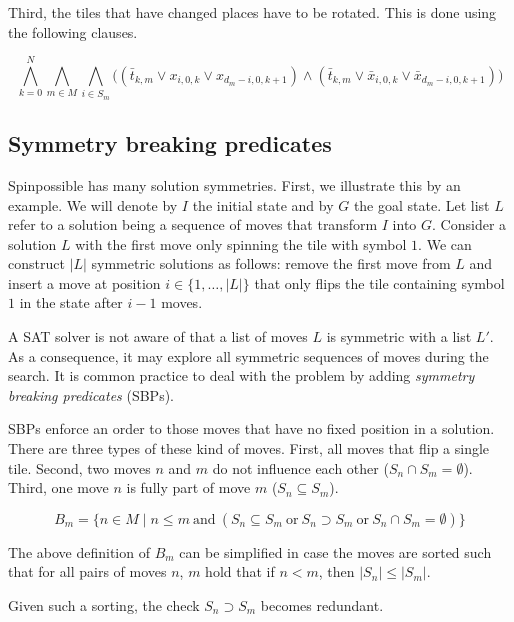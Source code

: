 \documentclass[]{llncs}
\begin{document}
Third, the tiles that have changed places have to be rotated. This is done using the following clauses.

\begin{equation}
\bigwedge_{k=0}^{N} \bigwedge_{m \in M} \bigwedge_{i \in S_m} \big( (\bar t_{k,m} \lor x_{i,0,k} \lor x_{d_m - i,0,k +
1} ) \land (\bar t_{k,m} \lor \bar x_{i,0,k} \lor \bar x_{d_m - i,0,k + 1} ) \big)
\end{equation}


\subsection{Symmetry breaking predicates}

Spinpossible has many solution symmetries. First, we illustrate this by an example. We will denote by $I$ the initial
state and by $G$ the goal state. Let list $L$ refer to a solution being a sequence of moves that transform $I$ into $G$.
Consider a solution $L$ with the first move only spinning the tile with symbol $1$. We can construct $|L|$ symmetric
solutions as follows: remove the first move from $L$ and insert a move at position $i \in \{1,\ldots, |L|\}$ that only
flips the tile containing symbol $1$ in the state after $i-1$ moves.

A SAT solver is not aware of that a list of moves $L$ is symmetric with a list $L'$. As a consequence, it may explore
all symmetric sequences of moves during the search. It is common practice to deal with the problem by adding {\em
symmetry breaking predicates} (SBPs).

SBPs enforce an order to those moves that have no fixed position in a solution. There are three types of these kind of
moves. First, all moves that flip a single tile. Second, two moves $n$ and $m$ do not influence each other ($S_n \cap
S_m = \emptyset$).  Third,  one move $n$  is fully part of move $m$ ($S_n \subseteq S_m$).


\begin{equation}
B_m = \{ n \in M \mid n \leq m \mathrm{~and~} ( S_n \subseteq S_m \mathrm{~or~} S_n \supset S_m \mathrm{~or~} S_n \cap
S_m = \emptyset) \}
\end{equation}

The above definition of $B_m$ can be simplified in case the moves are sorted such that for all pairs of moves $n$, $m$
hold that if $n < m$, then $|S_n| \leq |S_m|$.

Given such a sorting, the check $S_n \supset S_m$ becomes redundant.
\end{document}

